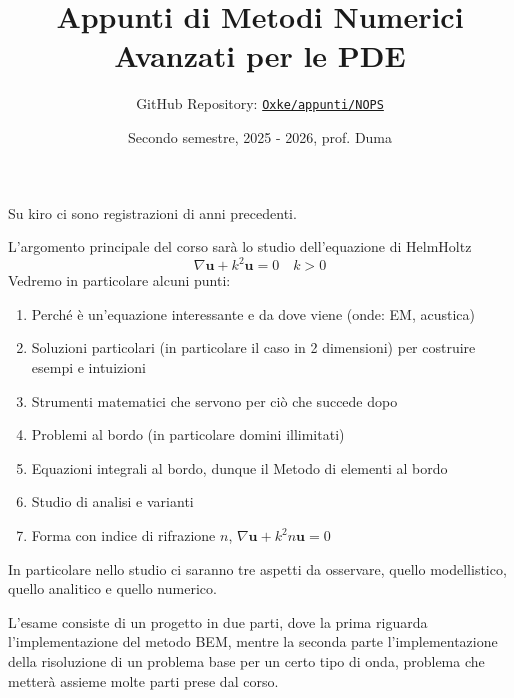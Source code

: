 

\title{Appunti di Metodi Numerici Avanzati per le PDE}
\author{GitHub Repository:
\href{https://github.com/Oxke/appunti/tree/main/AlgebraSuperiore}{\texttt{Oxke/appunti/NOPS}}}

\date{Secondo semestre, 2025 \-- 2026, prof. Duma}


\maketitle

Su kiro ci sono registrazioni di anni precedenti. 

L'argomento principale del
corso sarà lo studio dell'equazione di HelmHoltz
\[
  \nabla \mathbf{u}  + k^2 \mathbf{u}  = 0 \quad k > 0
\]
Vedremo in particolare alcuni punti:
\begin{enumerate}[label = \arabic*.]
    \item Perché è un'equazione interessante e da dove viene (onde: EM,
        acustica)
    \item Soluzioni particolari (in particolare il caso in 2 dimensioni) per
        costruire esempi e intuizioni
    \item Strumenti matematici che servono per ciò che succede dopo
    \item Problemi al bordo (in particolare domini illimitati)
    \item Equazioni integrali al bordo, dunque il Metodo di elementi al bordo
    \item Studio di analisi e varianti
    \item Forma con indice di rifrazione \(n\),
        \(\nabla \mathbf{u} + k^2 n \mathbf{u} = 0\)
\end{enumerate}

In particolare nello studio ci saranno tre aspetti da osservare, quello
modellistico, quello analitico e quello numerico.

L'esame consiste di un progetto in due parti, dove la prima riguarda
l'implementazione del metodo BEM, mentre la seconda parte l'implementazione
della risoluzione di un problema base per un certo tipo di onda, problema che
metterà assieme molte parti prese dal corso.

\tableofcontents




